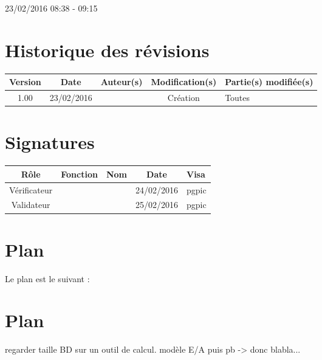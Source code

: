 \documentclass [a4paper] {article}
\begin{document}
23/02/2016			 				%
\hfill   
\hfill 	 08:38 - 09:15 				%



\section*{Historique des révisions}
\begin{center}
			\begin{tabular}{| c | c | c | c | p{4cm} |}
				\hline
				\rowcolor{Gray}
				Version & Date & Auteur(s) & Modification(s) & Partie(s) modifiée(s)		 \\
				\hline
				1.00 & 23/02/2016 & \Pierre & Création & Toutes \\
		\hline		
			\end{tabular}
		\end{center}

\section*{Signatures}

		\begin{center}
			\begin{tabular}{| c | c | c | c | p{4cm} |}
				\hline
				\rowcolor{Gray}
				Rôle & Fonction & Nom & Date & Visa		 \\
				\hline
				Vérificateur & \RQA & \Kafui & 24/02/2016 & pgpic \\[30pt]
				\hline
				Validateur & \CP & \Sergi & 25/02/2016 & pgpic \\[30pt]	
				\hline
			\end{tabular}
		\end{center}
		
\newpage		



\section{Plan}
Le plan est le suivant :

\section{Plan}


regarder taille BD sur un outil de calcul.
modèle E/A puis pb -> donc blabla...


\end{document}
